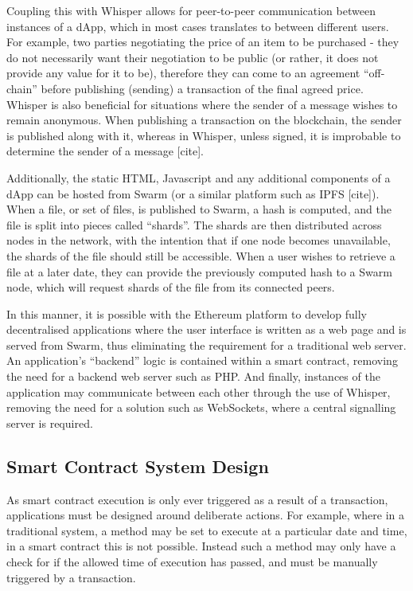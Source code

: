 Coupling this with Whisper allows for peer-to-peer communication between instances of a dApp, which in most cases translates to between different users. For example, two parties negotiating the price of an item to be purchased - they do not necessarily want their negotiation to be public (or rather, it does not provide any value for it to be), therefore they can come to an agreement “off-chain” before publishing (sending) a transaction of the final agreed price. Whisper is also beneficial for situations where the sender of a message wishes to remain anonymous. When publishing a transaction on the blockchain, the sender is published along with it, whereas in Whisper, unless signed, it is improbable to determine the sender of a message [cite]. %

Additionally, the static HTML, Javascript and any additional components of a dApp can be hosted from Swarm (or a similar platform such as IPFS [cite]). When a file, or set of files, is published to Swarm, a hash is computed, and the file is split into pieces called “shards”. The shards are then distributed across nodes in the network, with the intention that if one node becomes unavailable, the shards of the file should still be accessible. When a user wishes to retrieve a file at a later date, they can provide the previously computed hash to a Swarm node, which will request shards of the file from its connected peers. %

In this manner, it is possible with the Ethereum platform to develop fully decentralised applications where the user interface is written as a web page and is served from Swarm, thus eliminating the requirement for a traditional web server. An application’s “backend” logic is contained within a smart contract, removing the need for a backend web server such as PHP. And finally, instances of the application may communicate between each other through the use of Whisper, removing the need for a solution such as WebSockets, where a central signalling server is required.

\subsection{Smart Contract System Design}

As smart contract execution is only ever triggered as a result of a transaction, applications must be designed around deliberate actions. For example, where in a traditional system, a method may be set to execute at a particular date and time, in a smart contract this is not possible. Instead such a method may only have a check for if the allowed time of execution has passed, and must be manually triggered by a transaction.


